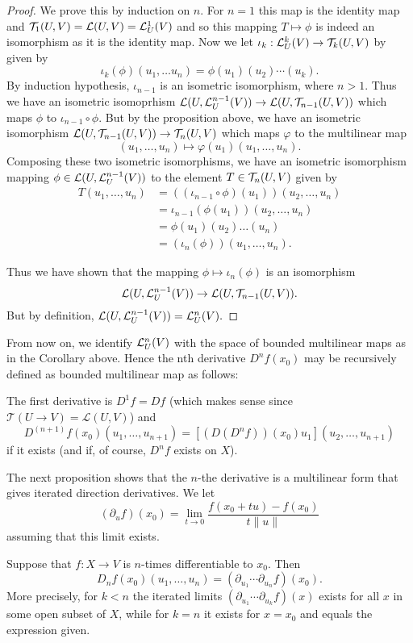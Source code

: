 \documentclass[twoside, a4paper, 10pt]{amsart}
\begin{document}
\begin{proof} We prove this by induction on $n$. For $n=1$ this map is the identity map and $\mathcal{T}_1(U,V) = \mathcal{L}(U,V) = \mathcal{L}^1_U(V)$ and so this mapping $T \mapsto \phi$ is indeed an isomorphism as it is the identity map. Now we let $\iota_k:\mathcal{L}^k_U(V) \to \mathcal{T}_k(U,V)$ by given by $$\iota_k(\phi)(u_1, \ldots u_n) = \phi(u_1)(u_2) \cdots (u_k).$$ By induction hypothesis, $\iota_{n-1}$ is an isometric isomorphism, where $n>1$.  Thus we have an isometric isomoprhism $\mathcal{L}(U, \mathcal{L}^{n-1}_U(V)) \to \mathcal{L}(U, \mathcal{T}_{n-1}(U,V))$ which maps $\phi$ to $\iota_{n-1} \circ \phi$. But by the proposition above, we have an isometric isomorphism $\mathcal{L}(U, \mathcal{T}_{n-1}(U,V)) \to \mathcal{T}_{n}(U,V)$ which maps $\varphi$ to the multilinear map $$(u_1, \ldots, u_n) \mapsto \varphi(u_1)(u_1, \ldots, u_n).$$ Composing these two isometric isomorphisms, we have an isometric isomorphism mapping $\phi \in \mathcal{L}(U, \mathcal{L}^{n-1}_U(V))$ to the element $T \in \mathcal{T}_{n}(U,V)$ given by 
\begin{align*} T(u_1, \ldots, u_n) &= ((\iota_{n-1} \circ \phi)(u_1))(u_2, \ldots, u_n) \\ 
&= \iota_{n-1}(\phi(u_1))(u_2, \ldots, u_n) \\
&= \phi(u_1)(u_2) \ldots (u_n) \\
& = (\iota_n(\phi))(u_1, \ldots, u_n).
 \end{align*}

Thus we have shown that the mapping $\phi \mapsto \iota_n(\phi)$ is an isomorphism $$\mathcal{L}(U, \mathcal{L}^{n-1}_U(V)) \to \mathcal{L}(U, \mathcal{T}_{n-1}(U,V)).$$ But by definition, $\mathcal{L}(U, \mathcal{L}^{n-1}_U(V)) = \mathcal{L}^{n}_U(V).$  \end{proof}

From now on, we identify $\mathcal{L}^n_U(V)$ with the space of bounded multilinear maps as in the Corollary above. 
Hence the nth derivative $D^nf(x_0)$ may be recursively defined as bounded multilinear map as follows:

 The first derivative is $D^1f = Df$ (which makes sense since $\mathcal{T}(U \to V) = \mathcal{L}(U, V)$) and $$D^{(n+1)}f (x_0)(u_1, \ldots, u_{n+1}) = [(D(D^nf))(x_0)u_1] (u_2, \ldots, u_{n+1})$$ if it exists (and if, of course, $D^nf$ exists on $X$). 

The next proposition shows that the $n$-the derivative is a multilinear form that gives iterated direction derivatives. We let $$(\partial_{u}f)(x_0) = \lim_{t \to 0} \frac{f(x_0+tu) - f(x_0)}{t \|u \|} $$ assuming that this limit exists.

\begin{prop}\label{prop: higher order derivative is limit} Suppose that $f:X \to V$ is $n$-times differentiable to $x_0$. Then $$D_n f (x_0)(u_1, \ldots, u_n) = (\partial_{u_1} \cdots \partial_{u_n} f) (x_0).$$ More precisely, for $k<n$ the iterated limits $(\partial_{u_1} \cdots \partial_{u_k}f) (x)$ exists for all $x$ in some open subset of $X$, while for $k=n$ it exists for $x=x_0$ and equals the expression given.

\end{prop}
\end{document}
